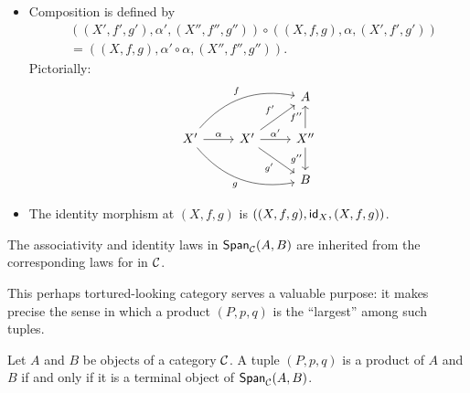 \begin{definition}
\begin{itemize}
\item Composition is defined by
  \begin{align}
    &((X',f',g'),\alpha',(X'',f'',g''))\circ ((X,f,g),\alpha,(X',f',g'))\\
    &= ((X,f,g),\alpha'\circ \alpha,(X'',f'',g'')).
  \end{align}
  Pictorially:
  \begin{equation}
\begin{tikzcd}
                                                                                 &                                                            & A                                      \\
X' \arrow[rru, "f", bend left] \arrow[rrd, "g"', bend right] \arrow[r, "\alpha"] & X' \arrow[r, "\alpha'"] \arrow[ru, "f'"] \arrow[rd, "g'"'] & X'' \arrow[u, "f''"] \arrow[d, "g''"'] \\
                                                                                 &                                                            & B
\end{tikzcd}
  \end{equation}

  \item The identity morphism at \((X,f,g)\) is \(((X,f,g),\mathsf{id}_{X},(X,f,g))\).
\end{itemize}
The associativity and identity laws in \(\mathsf{Span}_\mathcal C(A,B)\)
are inherited from the corresponding laws for in \(\mathcal C\).
\end{definition}

This perhaps tortured-looking category serves a valuable purpose:
it makes precise the sense in which a product \((P,p,q)\)
is the ``largest'' among such tuples.

\begin{proposition}
  \label{prop:prod-term}
  Let \(A\) and \(B\) be objects of a category \(\mathcal C\).
  A tuple \((P,p,q)\) is a product of \(A\) and \(B\)
  if and only if it is a terminal object of \(\mathsf{Span}_\mathcal C(A,B)\).
\end{proposition}

